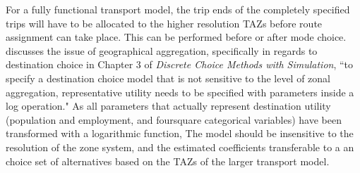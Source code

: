 For a fully functional transport model, the trip ends of the completely specified trips will have to be allocated to the higher resolution TAZs before route assignment can take place. This can be performed before or after mode choice. \textcite{Train09} discusses the issue of geographical aggregation, specifically in regards to destination choice in Chapter 3 of \textit{Discrete Choice Methods with Simulation}, 
``to specify a destination choice model that is not sensitive to the level of zonal aggregation, representative utility needs to be specified with parameters inside a log operation."
As all parameters that actually represent destination utility (population and employment, and foursquare categorical variables) have been transformed with a logarithmic function, The model should be insensitive to the resolution of the zone system, and the estimated coefficients transferable to a an choice set of alternatives based on the TAZs of the larger transport model.
